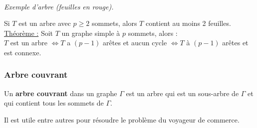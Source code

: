 \documentclass[11pt]{article}
\begin{document}
					\begin{center}
					 \\
					\textit{Exemple d'arbre (feuilles en rouge).}
					\end{center}
			
					Si $T$ est un arbre avec $p \geq 2$ sommets, alors $T$ contient au moins 2 feuilles.\\
						
					\underline{Théorème :} Soit $T$ un graphe simple à $p$ sommets, alors : \\ 
					$T$ est un arbre $\Leftrightarrow T$ a $(p-1)$ arêtes et aucun cycle $\Leftrightarrow T$ à $(p-1)$ arêtes et est connexe.
		\subsubsection{Arbre couvrant}
			Un \textbf{arbre couvrant} dans un graphe $\Gamma$ est un arbre qui est un sous-arbre de $\Gamma$ et qui contient tous les sommets de $\Gamma$.
			
			Il est utile entre autres pour résoudre le problème du voyageur de commerce.
	
\end{document}

